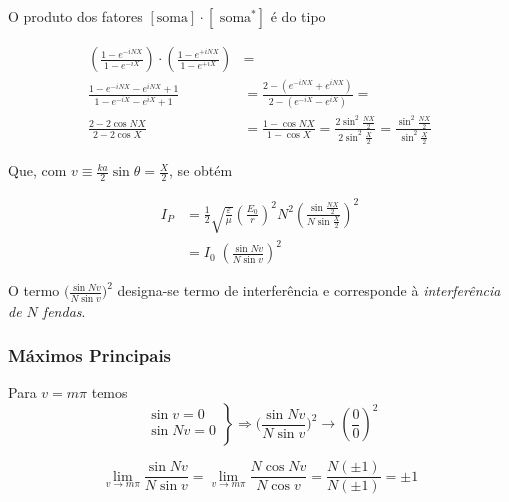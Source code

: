 \documentclass[a4paper,12pt]{article}
\begin{document}
O produto dos fatores $ [\text{soma} ] \cdot [\text{ soma}^* ]$ é do tipo 

\begin{align}
\label{eq:42} 
 \left( \frac{1-e^{-i N X}}{1-e^{-i X}} \right) \cdot \left( \frac{1-e^{+i N X}}{1-e^{+i X}}  \right)  &= \nonumber\\
%
%
	 \frac{1-e^{-i N X}-e^{i N X}+1}{1-e^{-i X} -e^{i X} +1} &= \frac{2-(e^{-i N X}+e^{i N X})}{2-(e^{-i X} -e^{i X})} = \nonumber \\
	\frac{2- 2 \cos NX }{2- 2 \cos X} &= \frac{1- \cos NX }{1- \cos X} = \frac{2\sin^2 \frac{NX }{2} }{2\sin^2 \frac{X }{2}} = \frac{\sin^2 \frac{NX }{2} }{\sin^2 \frac{X }{2}} 
\end{align}


Que, com $v \equiv \frac{k a }{2} \sin \theta = \frac{X}{2}$, se obtém  %

\begin{align}
	I_P &= \frac{1}{2} \sqrt{\frac{ \varepsilon}{\mu}} ( \frac{E_0}{r})^2 N^2 \left( \frac{\sin\frac{NX }{2} }{N \sin \frac{X }{2}} \right)^2 \nonumber \\
	&= I_0 \; \left( \frac{\sin N v }{N \sin v} \right)^2 \label{eq:45}
\end{align}

O termo $\big( \frac{\sin N v }{N \sin v} \big)^2$ designa-se termo de interferência e corresponde à \emph{interferência de $N$ fendas}.

\subsubsection{Máximos Principais}
Para $ v = m \pi$ temos 
\begin{equation*}
 \left.
	\begin{array}{rl} 
			\sin v =0 \\
			\sin Nv =0 \\			
	\end{array} \right\} 
  \Rightarrow \big( \frac{\sin N v }{N \sin v} \big)^2 \to \left( \frac{0 }{0} \right)^2 
\end{equation*}


\begin{equation}
	\label{eq:46} \lim_{v \rightarrow m \pi} \frac{\sin N v}{N \sin v} = \lim_{v \rightarrow m \pi} \frac{N \cos N v}{N \cos v} =\frac{N (\pm 1)}{N (\pm 1)} = \pm 1 
\end{equation}
\end{document}
